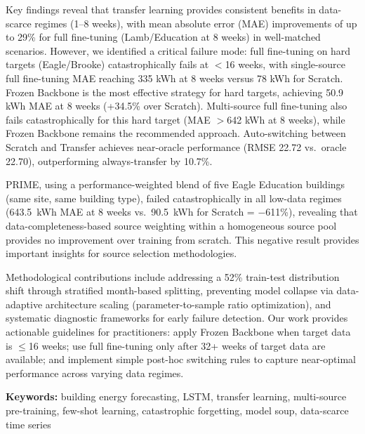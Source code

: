 \documentclass[12pt,a4paper]{report}
\begin{document}
Key findings reveal that transfer learning provides consistent benefits in data-scarce regimes (1--8 weeks), with mean absolute error (MAE) improvements of up to 29\% for full fine-tuning (Lamb/Education at 8 weeks) in well-matched scenarios. However, we identified a critical failure mode: full fine-tuning on hard targets (Eagle/Brooke) catastrophically fails at $<$16 weeks, with single-source full fine-tuning MAE reaching 335 kWh at 8 weeks versus 78 kWh for Scratch. Frozen Backbone is the most effective strategy for hard targets, achieving 50.9 kWh MAE at 8 weeks (+34.5\% over Scratch). Multi-source full fine-tuning also fails catastrophically for this hard target (MAE $>$642 kWh at 8 weeks), while Frozen Backbone remains the recommended approach. Auto-switching between Scratch and Transfer achieves near-oracle performance (RMSE 22.72 vs.\ oracle 22.70), outperforming always-transfer by 10.7\%.

PRIME, using a performance-weighted blend of five Eagle Education buildings (same site, same building type), failed catastrophically in all low-data regimes (643.5~kWh MAE at 8 weeks vs.\ 90.5~kWh for Scratch = $-$611\%), revealing that data-completeness-based source weighting within a homogeneous source pool provides no improvement over training from scratch. This negative result provides important insights for source selection methodologies.

Methodological contributions include addressing a 52\% train-test distribution shift through stratified month-based splitting, preventing model collapse via data-adaptive architecture scaling (parameter-to-sample ratio optimization), and systematic diagnostic frameworks for early failure detection. Our work provides actionable guidelines for practitioners: apply Frozen Backbone when target data is $\leq$16 weeks; use full fine-tuning only after 32+ weeks of target data are available; and implement simple post-hoc switching rules to capture near-optimal performance across varying data regimes.

\vspace{0.5cm}

\noindent\textbf{Keywords:} building energy forecasting, LSTM, transfer learning, multi-source pre-training, few-shot learning, catastrophic forgetting, model soup, data-scarce time series

\clearpage

\tableofcontents
\clearpage
\end{document}
